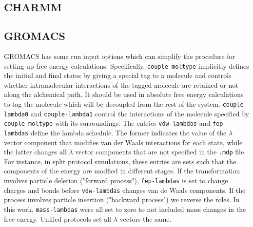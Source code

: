 \documentclass[journal=jctcce,manuscript=article]{achemso}
\newcommand{\inpopt}[1]{\texttt{#1}}
\begin{document}
\subsection{CHARMM}
\label{sec:charmm-results}




\subsection{GROMACS}
\label{sec:gromacs-results}

GROMACS has some run input options which can simplify the procedure 
for setting up free energy calculations.  Specifically, \inpopt{couple-moltype} 
implicitly defines the initial and final states by giving a special tag to a 
molecule and controls whether intramolecular interactions of the tagged 
molecule are retained or not along the alchemical path.  It should be used in 
absolute free energy calculations to tag the molecule which will be decoupled 
from the rest of the system.  \inpopt{couple-lambda0} and 
\inpopt{couple-lambda1} control the interactions of the molecule specified by 
\inpopt{couple-moltype} with its surroundings.
The entries \inpopt{vdw-lambdas} and \inpopt{fep-lambdas} 
define the lambda schedule.  The former indicates the value of the $\lambda$ 
vector component that modifies van der Waals interactions for each state,
while the latter changes all $\lambda$ vector components that are not specified 
in the \inpopt{.mdp} file.  For instance, in split protocol simulations, these 
entries are sets such that the components of the energy are modfied in 
different stages.  If the transformation involves particle deletion ("forward 
process"), \inpopt{fep-lambdas} is set to change charges and bonds
before \inpopt{vdw-lambdas} changes van de Waals components.
If the process involves particle insertion ("backward process") we reverse 
the roles.  In this work, \inpopt{mass-lambdas} were all set to zero  to not 
included mass changes in the free energy.  Unified protocols set all $\lambda$ 
vectors the same.

\end{document}
